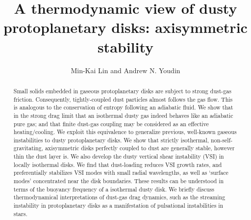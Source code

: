 \documentclass[iop, numberedappendix]{emulateapj}
\begin{document}
\title{A thermodynamic view of dusty protoplanetary disks:
  axisymmetric stability}  
\author{Min-Kai Lin and Andrew N. Youdin}

\begin{abstract}
  Small solids embedded in gaseous protoplanetary disks are subject
  to strong dust-gas friction. Consequently, tightly-coupled dust
  particles almost follows the gas flow. 
  This is analogous to the 
  conservation of entropy 
  following an adiabatic fluid.  We show that in the strong drag
  limit that an isothermal dusty gas indeed behaves like an  
  adiabatic pure gas; and that finite dust-gas coupling may be
  considered as an effective 
  heating/cooling. We exploit this equivalence 
  to 
  generalize previous, well-known gaseous instabilities
  to dusty protoplanetary disks.
We show that strictly isothermal, non-self-gravitating, axisymmetric
disks perfectly coupled to dust are generally stable, however thin the
dust layer is.  %
We also develop 
the dusty vertical shear instability (VSI) in locally isothermal
disks. We find that  dust-loading reduces VSI growth rates, and
preferentially stabilizes VSI modes with small radial 
wavelengths, as well as `surface modes' concentrated near the
disk boundaries. These results can be understood in terms of 
the buoyancy frequency of a isothermal dusty disk. 
We briefly discuss thermodynamical interpretations of 
dust-gas drag dynamics, such as the streaming instability in
protoplanetary disks as a manifestation of pulsational instabilities
in stars.  
\end{abstract}
\end{document}
